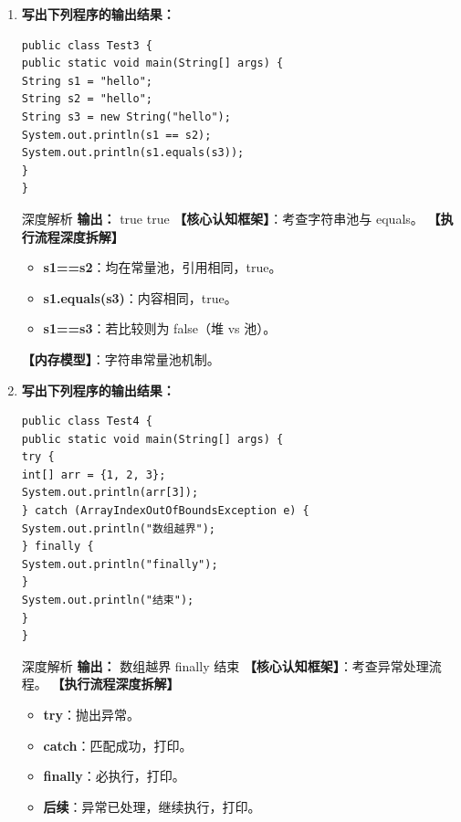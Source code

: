﻿\documentclass[12pt, a4paper]{ctexart}
\begin{document}
\begin{enumerate}[label=\textbf{\arabic*.}, itemsep=1em]
	\item \textbf{写出下列程序的输出结果：}
	      \begin{lstlisting}[style=JavaExam]
public class Test3 {
public static void main(String[] args) {
String s1 = "hello";
String s2 = "hello";
String s3 = new String("hello");
System.out.println(s1 == s2);
System.out.println(s1.equals(s3));
}
}
    \end{lstlisting}
	      \begin{bluebox}{深度解析}
		      \textbf{输出：}
		      true
		      true
		      \textbf{【核心认知框架】}：考查字符串池与 equals。
		      \textbf{【执行流程深度拆解】}
		      \begin{itemize}[leftmargin=*, nosep]
			      \item \textbf{s1==s2}：均在常量池，引用相同，true。
			      \item \textbf{s1.equals(s3)}：内容相同，true。
			      \item \textbf{s1==s3}：若比较则为 false（堆 vs 池）。
		      \end{itemize}
		      \textbf{【内存模型】}：字符串常量池机制。
	      \end{bluebox}

	\item \textbf{写出下列程序的输出结果：}
	      \begin{lstlisting}[style=JavaExam]
public class Test4 {
public static void main(String[] args) {
try {
int[] arr = {1, 2, 3};
System.out.println(arr[3]);
} catch (ArrayIndexOutOfBoundsException e) {
System.out.println("数组越界");
} finally {
System.out.println("finally");
}
System.out.println("结束");
}
}
    \end{lstlisting}
	      \begin{bluebox}{深度解析}
		      \textbf{输出：}
		      数组越界
		      finally
		      结束
		      \textbf{【核心认知框架】}：考查异常处理流程。
		      \textbf{【执行流程深度拆解】}
		      \begin{itemize}[leftmargin=*, nosep]
			      \item \textbf{try}：抛出异常。
			      \item \textbf{catch}：匹配成功，打印。
			      \item \textbf{finally}：必执行，打印。
			      \item \textbf{后续}：异常已处理，继续执行，打印。
		      \end{itemize}
	      \end{bluebox}


\end{enumerate}
\end{document}
